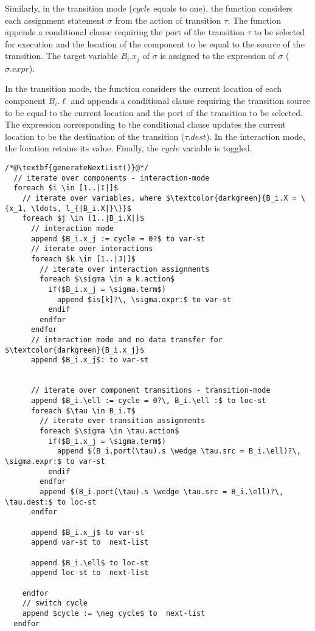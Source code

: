 Similarly, in the transition mode ($cycle$ equals to one), the function considers each assignment statement $\sigma$ from the action of transition $\tau$. The function appends a conditional clause requiring the port of the transition $\tau$ to be selected for execution and the location of the component to be equal to the source of the transition. The target variable $B_i.x_j$ of $\sigma$ is assigned to the expression of $\sigma$ ($\sigma.expr$). 

In the transition mode, the function considers the current location of each component $B_i.\ell$ and appends a conditional clause requiring the transition source to be equal to the current location and the port of the transition to be selected. The expression corresponding to the conditional clause updates the current location to be the destination of the transition ($\tau.dest$).  In the interaction mode, the location retains its value. Finally, the $cycle$ variable is toggled. 

\begin{lstlisting}
/*@\textbf{generateNextList()}@*/ 
  // iterate over components - interaction-mode
  foreach $i \in [1..|I|]$ 
    // iterate over variables, where $\textcolor{darkgreen}{B_i.X = \{x_1, \ldots, l_{|B_i.X|}\}}$ 
    foreach $j \in [1..|B_i.X|]$ 
      // interaction mode
      append $B_i.x_j := cycle = 0?$ to var-st
      // iterate over interactions
      foreach $k \in [1..|J|]$ 
        // iterate over interaction assignments
        foreach $\sigma \in a_k.action$
          if($B_i.x_j = \sigma.term$)
            append $is[k]?\, \sigma.expr:$ to var-st
          endif
        endfor
      endfor
      // interaction mode and no data transfer for $\textcolor{darkgreen}{B_i.x_j}$
      append $B_i.x_j$: to var-st 
      
      
      // iterate over component transitions - transition-mode
      append $B_i.\ell := cycle = 0?\, B_i.\ell :$ to loc-st
      foreach $\tau \in B_i.T$ 
        // iterate over transition assignments
        foreach $\sigma \in \tau.action$
          if($B_i.x_j = \sigma.term$)
            append $(B_i.port(\tau).s \wedge \tau.src = B_i.\ell)?\, \sigma.expr:$ to var-st 
          endif
        endfor
        append $(B_i.port(\tau).s \wedge \tau.src = B_i.\ell)?\, \tau.dest:$ to loc-st 
      endfor  
      
      append $B_i.x_j$ to var-st 
      append var-st to  next-list 
      
      append $B_i.\ell$ to loc-st 
      append loc-st to  next-list 

    endfor
    // switch cycle
    append $cycle := \neg cycle$ to  next-list 
  endfor
\end{lstlisting}




